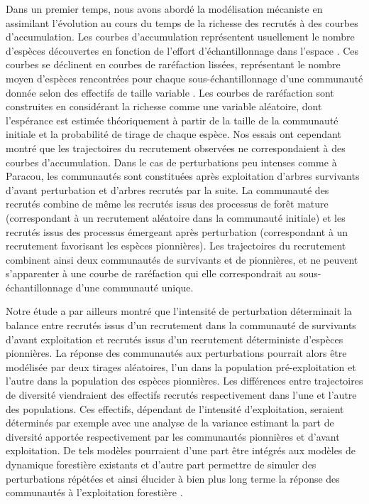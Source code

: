 \documentclass[
  11pt,
  french,
  A4paper,
  extrafontsizes,onecolumn,openright
  ]{memoir}
\begin{document}
Dans un premier temps, nous avons abordé la modélisation mécaniste en
assimilant l'évolution au cours du temps de la richesse des recrutés à
des courbes d'accumulation. Les courbes d'accumulation représentent
usuellement le nombre d'espèces découvertes en fonction de l'effort
d'échantillonnage dans l'espace \autocite{Gotelli2001}. Ces courbes se
déclinent en courbes de raréfaction lissées, représentant le nombre
moyen d'espèces rencontrées pour chaque sous-échantillonnage d'une
communauté donnée selon des effectifs de taille variable
\autocite{Ugland2003}. Les courbes de raréfaction sont construites en
considérant la richesse comme une variable aléatoire, dont l'espérance
est estimée théoriquement à partir de la taille de la communauté
initiale et la probabilité de tirage de chaque espèce. Nos essais ont
cependant montré que les trajectoires du recrutement observées ne
correspondaient à des courbes d'accumulation. Dans le cas de
perturbations peu intenses comme à Paracou, les communautés sont
constituées après exploitation d'arbres survivants d'avant perturbation
et d'arbres recrutés par la suite. La communauté des recrutés combine de
même les recrutés issus des processus de forêt mature (correspondant à
un recrutement aléatoire dans la communauté initiale) et les recrutés
issus des processus émergeant après perturbation (correspondant à un
recrutement favorisant les espèces pionnières). Les trajectoires du
recrutement combinent ainsi deux communautés de survivants et de
pionnières, et ne peuvent s'apparenter à une courbe de raréfaction qui
elle correspondrait au sous-échantillonnage d'une communauté unique.

Notre étude a par ailleurs montré que l'intensité de perturbation
déterminait la balance entre recrutés issus d'un recrutement dans la
communauté de survivants d'avant exploitation et recrutés issus d'un
recrutement déterministe d'espèces pionnières. La réponse des
communautés aux perturbations pourrait alors être modélisée par deux
tirages aléatoires, l'un dans la population pré-exploitation et l'autre
dans la population des espèces pionnières. Les différences entre
trajectoires de diversité viendraient des effectifs recrutés
respectivement dans l'une et l'autre des populations. Ces effectifs,
dépendant de l'intensité d'exploitation, seraient déterminés par exemple
avec une analyse de la variance estimant la part de diversité apportée
respectivement par les communautés pionnières et d'avant exploitation.
De tels modèles pourraient d'une part être intégrés aux modèles de
dynamique forestière existants et d'autre part permettre de simuler des
perturbations répétées et ainsi élucider à bien plus long terme la
réponse des communautés à l'exploitation forestière
\autocite{Dufour2012}.
\end{document}
